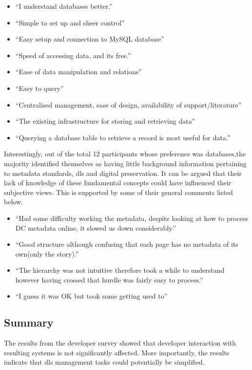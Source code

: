 \begin{itemize}
 \item ``I understand databases better.''
 \item ``Simple to set up and sheer control''
 \item ``Easy setup and connection to MySQL database''
 \item ``Speed of accessing data, and its free.''
 \item ``Ease of data manipulation and relations''
 \item ``Easy to query''
 \item ``Centralised management, ease of design, availability of support/literature''
 \item ``The existing infrastructure for storing and retrieving data''
 \item ``Querying a database table to retrieve a record is most useful for data.''
\end{itemize}

Interestingly, out of the total \num{12} participants whose preference was databases,the majority identified themselves as having little background information pertaining to metadata standards, \glspl{dl} and digital preservation. It can be argued that their lack of knowledge of these fundamental concepts could have influenced their subjective views. This is supported by some of their general comments listed below.

\begin{itemize}
 \item ``Had some difficulty working the metadata, despite looking at how to process DC metadata online, it slowed us down considerably.''
 \item ``Good structure although confusing that each page has no metadata of its own(only the story).''
 \item ``The hierarchy was not intuitive therefore took a while to understand however having crossed that hurdle was fairly easy to process.''
 \item ``I guess it was OK but took some getting used to''
\end{itemize}

\subsection{Summary}
\label{sec:evaluation:developer-survey:conclusion}

The results from the developer survey showed that developer interaction with resulting systems is not significantly affected. More importantly, the results indicate that \gls{dls} management tasks could potentially be simplified.